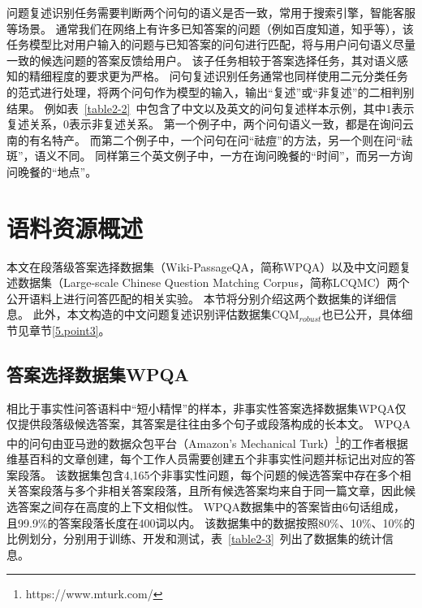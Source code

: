 问题复述识别任务需要判断两个问句的语义是否一致，常用于搜索引擎，智能客服等场景。
通常我们在网络上有许多已知答案的问题（例如百度知道，知乎等），该任务模型比对用户输入的问题与已知答案的问句进行匹配，将与用户问句语义尽量一致的候选问题的答案反馈给用户。
该子任务相较于答案选择任务，其对语义感知的精细程度的要求更为严格。
问句复述识别任务通常也同样使用二元分类任务的范式进行处理，将两个问句作为模型的输入，输出“复述”或“非复述”的二相判别结果。
例如表~\ref{table2-2}~中包含了中文以及英文的问句复述样本示例，其中1表示复述关系，0表示非复述关系。
第一个例子中，两个问句语义一致，都是在询问云南的有名特产。
而第二个例子中，一个问句在问“祛痘”的方法，另一个则在问“祛斑”，语义不同。
同样第三个英文例子中，一方在询问晚餐的“时间”，而另一方询问晚餐的“地点”。



\section{语料资源概述}
\label{2.2 语料资源概述}

本文在段落级答案选择数据集（Wiki-PassageQA，简称WPQA）\cite{cohen2018wikipassageqa}以及中文问题复述数据集（Large-scale Chinese Question Matching Corpus，简称LCQMC）\cite{liu2018lcqmc}两个公开语料上进行问答匹配的相关实验。
本节将分别介绍这两个数据集的详细信息。
此外，本文构造的中文问题复述识别评估数据集CQM$_{robust}$也已公开，具体细节见章节\ref{5.point3}。

\subsection{答案选择数据集WPQA}

相比于事实性问答语料中“短小精悍”的样本，非事实性答案选择数据集WPQA仅仅提供段落级候选答案，其答案是往往由多个句子或段落构成的长本文。
WPQA中的问句由亚马逊的数据众包平台（Amazon’s Mechanical Turk）\footnote{https://www.mturk.com/}的工作者根据维基百科的文章创建，每个工作人员需要创建五个非事实性问题并标记出对应的答案段落。
该数据集包含4,165个非事实性问题，每个问题的候选答案中存在多个相关答案段落与多个非相关答案段落，且所有候选答案均来自于同一篇文章，因此候选答案之间存在高度的上下文相似性。
WPQA数据集中的答案皆由6句话组成，且99.9\%的答案段落长度在400词以内。
该数据集中的数据按照80\%、10\%、10\%的比例划分，分别用于训练、开发和测试，表~\ref{table2-3}~列出了数据集的统计信息。


